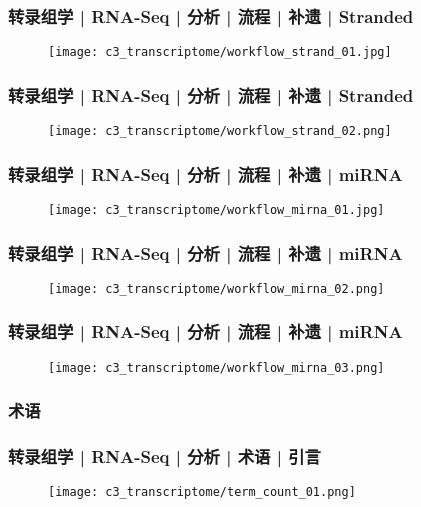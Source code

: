 \begin{frame}
  \frametitle{转录组学 | RNA-Seq | 分析 | 流程 | 补遗 | Stranded}
  \begin{figure}
    \centering
    \texttt{[image: c3\_transcriptome/workflow\_strand\_01.jpg]}
  \end{figure}
\end{frame}

\begin{frame}
  \frametitle{转录组学 | RNA-Seq | 分析 | 流程 | 补遗 | Stranded}
  \begin{figure}
    \centering
    \texttt{[image: c3\_transcriptome/workflow\_strand\_02.png]}
  \end{figure}
\end{frame}

\begin{frame}
  \frametitle{转录组学 | RNA-Seq | 分析 | 流程 | 补遗 | miRNA}
  \begin{figure}
    \centering
    \texttt{[image: c3\_transcriptome/workflow\_mirna\_01.jpg]}
  \end{figure}
\end{frame}

\begin{frame}
  \frametitle{转录组学 | RNA-Seq | 分析 | 流程 | 补遗 | miRNA}
  \begin{figure}
    \centering
    \texttt{[image: c3\_transcriptome/workflow\_mirna\_02.png]}
  \end{figure}
\end{frame}

\begin{frame}
  \frametitle{转录组学 | RNA-Seq | 分析 | 流程 | 补遗 | miRNA}
  \begin{figure}
    \centering
    \texttt{[image: c3\_transcriptome/workflow\_mirna\_03.png]}
  \end{figure}
\end{frame}

\subsubsection{术语}
\begin{frame}
  \frametitle{转录组学 | RNA-Seq | 分析 | 术语 | 引言}
  \begin{figure}
    \centering
    \texttt{[image: c3\_transcriptome/term\_count\_01.png]}
  \end{figure}
\end{frame}

